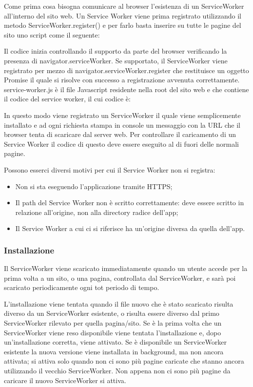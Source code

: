 \documentclass[11pt ,a4paper , twoside , openright ]{article}
\begin{document}
Come prima cosa bisogna comunicare al browser l’esistenza di un ServiceWorker all’interno del sito web. Un Service Worker viene prima registrato utilizzando il metodo ServiceWorker.register() e per farlo basta inserire su tutte le pagine del sito uno script come il seguente:

Il codice inizia controllando il supporto da parte del browser verificando la presenza di navigator.serviceWorker. Se supportato, il ServiceWorker viene registrato per mezzo di navigator.serviceWorker.register che restituisce un oggetto Promise il quale si risolve con successo a registrazione avvenuta correttamente.
service-worker.js è il file Javascript residente nella root del sito web e che contiene il codice del service worker, il cui codice è:
\pagebreak

In questo modo viene registrato un ServiceWorker il quale viene semplicemente installato e ad ogni richiesta stampa in console un messaggio con la URL che il browser tenta di scaricare dal server web. Per controllare il caricamento di un Service Worker il codice di questo deve essere eseguito al di fuori delle normali pagine.

Possono esserci diversi motivi per cui il Service Worker non si registra:
\begin{itemize}
	\item Non si sta eseguendo l'applicazione tramite HTTPS;
	\item Il path del Service Worker non è scritto correttamente: deve essere scritto in relazione all'origine, non alla directory radice dell'app;
	\item Il Service Worker a cui ci si riferisce ha un'origine diversa da quella dell'app.
\end{itemize}

\subsubsection{Installazione}
Il ServiceWorker viene scaricato immediatamente quando un utente accede per la prima volta a un sito, o una pagina, controllata dal ServiceWorker, e sarà poi scaricato periodicamente ogni tot periodo di tempo.

L'installazione viene tentata quando il file nuovo che è stato scaricato risulta diverso da un ServiceWorker esistente, o risulta essere diverso dal primo ServiceWorker rilevato per quella pagina/sito. Se è la prima volta che un ServiceWorker viene reso disponibile viene tentata l'installazione e, dopo un'installazione corretta, viene attivato. Se è disponibile un ServiceWorker esistente la nuova versione viene installata in background, ma non ancora attivata; si attiva solo quando non ci sono più pagine caricate che stanno ancora utilizzando il vecchio ServiceWorker. Non appena non ci sono più pagine da caricare il nuovo ServiceWorker si attiva.
\end{document}

